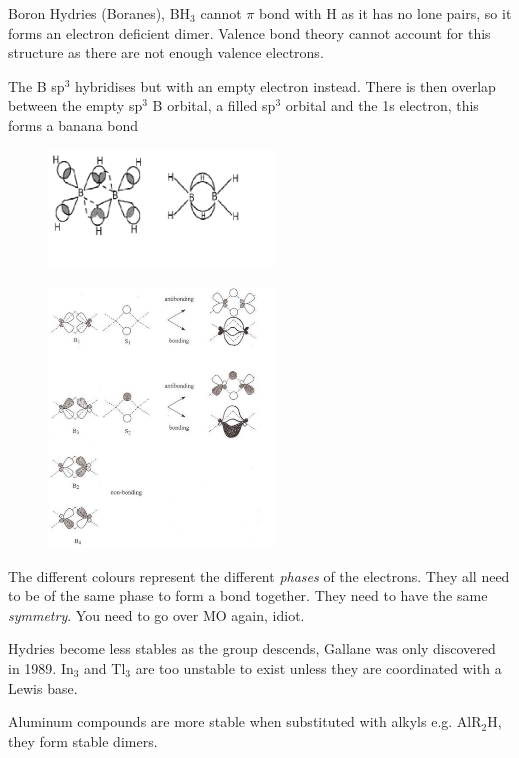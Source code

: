 \documentclass{article}
\renewcommand{\sup}[1]{\(^#1\)}
\newcommand{\sub}[1]{\(_#1\)}
\begin{document}
    Boron Hydries (Boranes), BH\sub{3} cannot $\pi$ bond with H as it has no lone pairs, so it forms an electron
    deficient dimer. Valence bond theory cannot account for this structure as there are not enough valence electrons.

    The B sp\sup{3} hybridises but with an empty electron instead. There is then overlap between the empty sp\sup{3} B 
    orbital, a filled sp\sup{3} orbital and the 1s electron, this forms a banana bond

    \begin{figure}[h]
        \centering
        \includegraphics[width=6cm]{ban.png}
    \end{figure}

    \begin{figure}[h]
        \centering
        \includegraphics[width=6cm]{bmo.jpg}
    \end{figure}

    The different colours represent the different \emph{phases} of the electrons. They all need to be of the same phase
    to form a bond together. They need to have the same \emph{symmetry}. You need to go over MO again, idiot.

    Hydries become less stables as the group descends, Gallane was only discovered in 1989.
    In\sub{3} and Tl\sub{3} are too unstable to exist unless they are coordinated with a Lewis base. 

    Aluminum compounds are more stable when substituted with alkyls e.g. AlR\sub{2}H, they form stable dimers.
\end{document}
